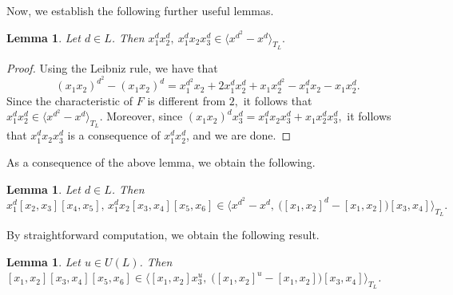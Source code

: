 \documentclass[a4paper,reqno]{amsart}
\newtheorem{lemma}[theorem]{Lemma}
\theoremstyle{definition}
\numberwithin{equation}{section}
\numberwithin{theorem}{section}
\newcommand{\black}{\color{black}}
\begin{document}
Now, we establish the following further useful lemmas.

\begin{lemma} \label{lem: consequences Ide_1 1 var}
Let $d\in L$. Then $x_1^{d}x_2^{d},\ x_1^{d}x_2 x_3^{d}\in \langle x^{d^2}-x^{d}\rangle_{T_L}.$
\end{lemma}
\begin{proof}
Using the Leibniz rule, we have that
$$(x_1 x_2)^{d^2} -(x_1 x_2)^d= x_1^{d^2} x_2 + 2 x_1^d x_2^d + x_1 x_2^{d^2} - x_1^d x_2 - x_1 x_2^d.$$
Since the characteristic of $F$ is different from $2,$ it follows that $x_1^d x_2^d\in \langle x^{d^2}-x^{d}\rangle_{T_L} .$
Moreover, since $(x_1x_2)^d x_3^d=x_1^{d}x_2 x_3^{d}+ x_1x_2^{d} x_3^{d},$ it follows that $x_1^{d}x_2 x_3^{d}$ is a consequence of  $x_1^d x_2^d$, and we are done.
\end{proof}

As a consequence of the above lemma, we obtain the following.
\begin{lemma}\label{lem: consequences Ide_1}
    Let $d\in L$. Then 
    $$ x_1^{d}[x_2,x_3][x_4,x_5], \, x_1^{d}x_2[x_3,x_4][x_5,x_6]\in \langle  x^{d^2}-x^{d}, \ \big([x_1,x_2]^{d}-[x_1,x_2]\big)[x_3,x_4]\rangle_{T_L}.$$
\end{lemma}


By straightforward computation, we obtain the following result.
\begin{lemma}\label{lem: conseq 3 commutators 1} 
\black
    Let $u\in U(L)$. Then $[x_1,x_2][x_3,x_4][x_5,x_6]\in \langle [x_1,x_2]x_3^{u},\; \big([x_1,x_2]^{u}-[x_1,x_2]\big)[x_3,x_4] \rangle_{T_L}$.
\end{lemma}
\end{document}
